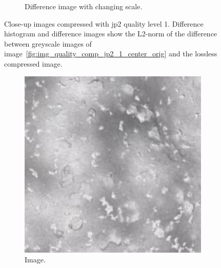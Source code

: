 \begin{figure}[htb]
\begin{subfigure}[b]{0.48\textwidth}
        \caption{Difference image with changing scale.}
        \label{fig:img_quality_comp_jp2_1_center_diff_rel}
    \end{subfigure}
    \caption{Close-up images compressed with \gls{jp2} quality level 1. Difference histogram and difference images show the L2-norm of the difference between greyscale images of image~\ref{fig:img_quality_comp_jp2_1_center_orig} and the lossless compressed image.}
    \label{fig:img_quality_comp_jp2_1_center}
\end{figure}

\begin{figure}[htb]
    \centering
    \begin{subfigure}[b]{0.48\textwidth}
        \centering
        \includegraphics[width=\textwidth]{doc/thesis/0_figures/compare_quality/set1/jp2_5_center.png}
        \caption{Image.}
        \label{fig:img_quality_comp_jp2_5_center_orig}
    \end{subfigure}
    \begin{subfigure}[b]{0.48\textwidth}
        \centering

\end{subfigure}
\end{figure}
